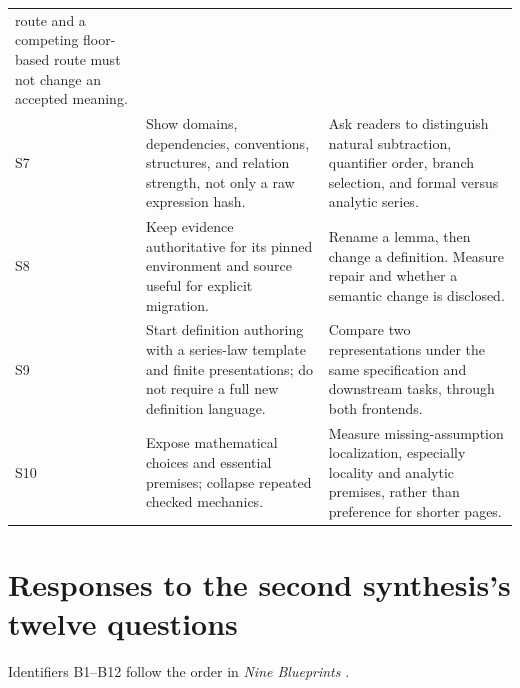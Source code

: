 \documentclass[11pt,letterpaper]{article}
\numberwithin{equation}{section}
\begin{document}
\begin{longtable}{@{}P{.07\textwidth}P{.39\textwidth}P{.46\textwidth}@{}}
route and a competing floor-based route must not change an accepted meaning.\\
S7 & Show domains, dependencies, conventions, structures, and relation strength,
not only a raw expression hash. & Ask readers to distinguish natural subtraction,
quantifier order, branch selection, and formal versus analytic series.\\
S8 & Keep evidence authoritative for its pinned environment and source useful
for explicit migration. & Rename a lemma, then change a definition. Measure
repair and whether a semantic change is disclosed.\\
S9 & Start definition authoring with a series-law template and finite presentations;
do not require a full new definition language. & Compare two representations
under the same specification and downstream tasks, through both frontends.\\
S10 & Expose mathematical choices and essential premises; collapse repeated checked
mechanics. & Measure missing-assumption localization, especially locality and
analytic premises, rather than preference for shorter pages.\\
\bottomrule
\end{longtable}

\section{Responses to the second synthesis's twelve questions}
Identifiers B1--B12 follow the order in \emph{Nine Blueprints} \cite{blueprints}.
\end{document}
